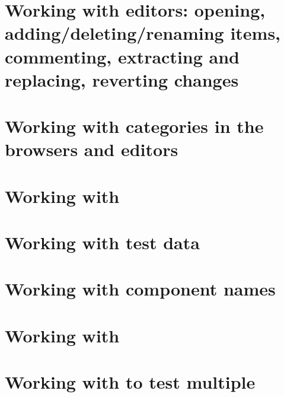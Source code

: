 \section{Working with editors: opening, adding/deleting/renaming items, commenting, extracting and replacing, reverting changes}
\label{WorkingWithEditors}


\section{Working with categories in the browsers and editors}
\label{WorkingWithCategories}


\clearpage
\section{Working with \gdcases{}}
\label{WorkingWithTestCases}


\clearpage

\section{Working with test data}
\label{WorkingWithData}


\clearpage

\section{Working with component names}
\label{reass}



\clearpage

\section{Working with \gdsuites{}}
\label{WorkingWithSuites}


\clearpage 

\section{Working with \gdjobs{} to test multiple \gdauts{}}
\label{WorkingWithJobs}


